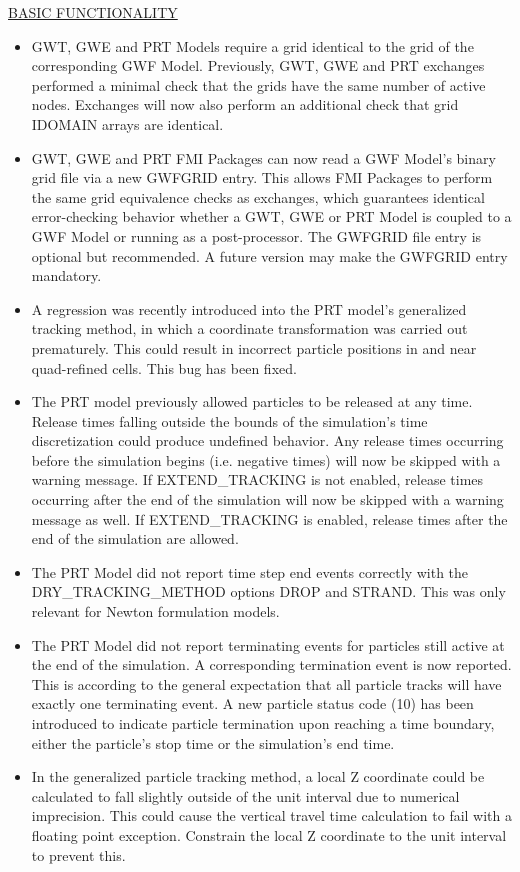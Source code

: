 \underline{BASIC FUNCTIONALITY}
\begin{itemize}
	\item GWT, GWE and PRT Models require a grid identical to the grid of the corresponding GWF Model. Previously, GWT, GWE and PRT exchanges performed a minimal check that the grids have the same number of active nodes. Exchanges will now also perform an additional check that grid IDOMAIN arrays are identical.
	\item GWT, GWE and PRT FMI Packages can now read a GWF Model's binary grid file via a new GWFGRID entry. This allows FMI Packages to perform the same grid equivalence checks as exchanges, which guarantees identical error-checking behavior whether a GWT, GWE or PRT Model is coupled to a GWF Model or running as a post-processor. The GWFGRID file entry is optional but recommended. A future version may make the GWFGRID entry mandatory.
	\item A regression was recently introduced into the PRT model's generalized tracking method, in which a coordinate transformation was carried out prematurely. This could result in incorrect particle positions in and near quad-refined cells. This bug has been fixed.
	\item The PRT model previously allowed particles to be released at any time. Release times falling outside the bounds of the simulation's time discretization could produce undefined behavior. Any release times occurring before the simulation begins (i.e. negative times) will now be skipped with a warning message. If EXTEND\_TRACKING is not enabled, release times occurring after the end of the simulation will now be skipped with a warning message as well. If EXTEND\_TRACKING is enabled, release times after the end of the simulation are allowed.
	\item The PRT Model did not report time step end events correctly with the DRY\_TRACKING\_METHOD options DROP and STRAND. This was only relevant for Newton formulation models.
	\item The PRT Model did not report terminating events for particles still active at the end of the simulation. A corresponding termination event is now reported. This is according to the general expectation that all particle tracks will have exactly one terminating event. A new particle status code (10) has been introduced to indicate particle termination upon reaching a time boundary, either the particle's stop time or the simulation's end time.
	\item In the generalized particle tracking method, a local Z coordinate could be calculated to fall slightly outside of the unit interval due to numerical imprecision. This could cause the vertical travel time calculation to fail with a floating point exception. Constrain the local Z coordinate to the unit interval to prevent this.

\end{itemize}
